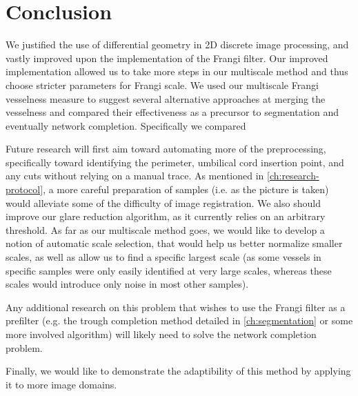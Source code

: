 \chapter{Conclusion} \label{ch:conclusion}

We justified the use of differential geometry in 2D discrete image processing, and vastly improved upon the implementation of the Frangi filter. Our improved implementation allowed us to take more steps in our multiscale method and thus choose stricter parameters for Frangi scale. We used our multiscale Frangi vesselness measure to suggest several alternative approaches at merging the vesselness and compared their effectiveness as a precursor to segmentation and eventually network completion. Specifically we compared 

Future research will first aim toward automating more of the preprocessing, specifically toward identifying the perimeter, umbilical cord insertion point, and any cuts without relying on a manual trace.  As mentioned in \cref{ch:research-protocol}, a more careful preparation of samples (i.e. as the picture is taken) would alleviate some of the difficulty of image registration. We also should improve our glare reduction algorithm, as it currently relies on an arbitrary threshold. As far as our multiscale method goes, we would like to develop a notion of automatic scale selection, that would help us better normalize smaller scales, as well as allow us to find a specific largest scale (as some vessels in specific samples were only easily identified at very large scales, whereas these scales would introduce only noise in most other samples).

Any additional research on this problem that wishes to use the Frangi filter as a prefilter  (e.g. the trough completion method detailed in \cref{ch:segmentation} or some more involved algorithm) will likely need to solve the network completion problem.

Finally, we would like to demonstrate the adaptibility of this method by applying it to more image domains.